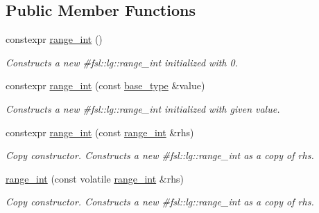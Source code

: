 \subsection*{Public Member Functions}
\begin{DoxyCompactItemize}
\item 
\mbox{\label{classfsl_1_1ver1__0_1_1lg_1_1range__int_ad0a9321b8eccf2ba2ec4ca3c63c4625c}} 
constexpr \mbox{\hyperlink{classfsl_1_1ver1__0_1_1lg_1_1range__int_ad0a9321b8eccf2ba2ec4ca3c63c4625c}{range\+\_\+int}} ()
\begin{DoxyCompactList}\small\item\em Constructs a new \#fsl\+::lg\+::range\+\_\+int initialized with 0. \end{DoxyCompactList}\item 
constexpr \mbox{\hyperlink{classfsl_1_1ver1__0_1_1lg_1_1range__int_a53393ed362d0ab23d124de72ae391330}{range\+\_\+int}} (const \mbox{\hyperlink{classfsl_1_1ver1__0_1_1lg_1_1range__int_af14c814b65a761cd387e7577eb2ef78c}{base\+\_\+type}} \&value)
\begin{DoxyCompactList}\small\item\em Constructs a new \#fsl\+::lg\+::range\+\_\+int initialized with given value. \end{DoxyCompactList}\item 
\mbox{\label{classfsl_1_1ver1__0_1_1lg_1_1range__int_ad68edd6f568c0208d9f815f5c5322a2a}} 
constexpr \mbox{\hyperlink{classfsl_1_1ver1__0_1_1lg_1_1range__int_ad68edd6f568c0208d9f815f5c5322a2a}{range\+\_\+int}} (const \mbox{\hyperlink{classfsl_1_1ver1__0_1_1lg_1_1range__int}{range\+\_\+int}} \&rhs)
\begin{DoxyCompactList}\small\item\em Copy constructor. Constructs a new \#fsl\+::lg\+::range\+\_\+int as a copy of {\itshape rhs}. \end{DoxyCompactList}\item 
\mbox{\label{classfsl_1_1ver1__0_1_1lg_1_1range__int_a31b3caaa7122ebfe97891d48080b8aa0}} 
\mbox{\hyperlink{classfsl_1_1ver1__0_1_1lg_1_1range__int_a31b3caaa7122ebfe97891d48080b8aa0}{range\+\_\+int}} (const volatile \mbox{\hyperlink{classfsl_1_1ver1__0_1_1lg_1_1range__int}{range\+\_\+int}} \&rhs)
\begin{DoxyCompactList}\small\item\em Copy constructor. Constructs a new \#fsl\+::lg\+::range\+\_\+int as a copy of {\itshape rhs}. \end{DoxyCompactList}\item 

\end{DoxyCompactItemize}
